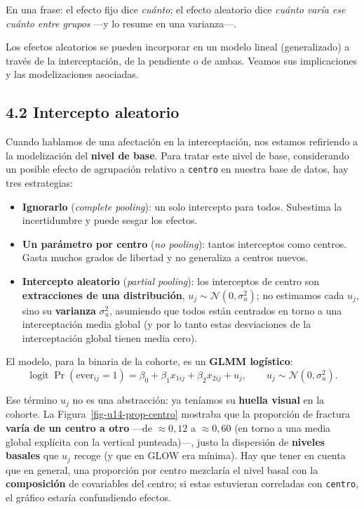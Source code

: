 \documentclass[
  letterpaper,
  DIV=11,
  numbers=noendperiod]{scrartcl}
\providecommand{\tightlist}{%
  \setlength{\itemsep}{0pt}\setlength{\parskip}{0pt}}\usepackage{longtable,booktabs,array}
\begin{document}
En una frase: el efecto fijo dice \emph{cuánto}; el efecto aleatorio
dice \emph{cuánto varía ese cuánto entre grupos} ---y lo resume en una
varianza---.

Los efectos aleatorios se pueden incorporar en un modelo lineal
(generalizado) a través de la interceptación, de la pendiente o de
ambas. Veamos sus implicaciones y las modelizaciones asociadas.

\hypertarget{sec-u14-intercepto}{%
\subsection{4.2 Intercepto aleatorio}\label{sec-u14-intercepto}}

Cuando hablamos de una afectación en la interceptación, nos estamos
refiriendo a la modelización del \textbf{nivel de base}. Para tratar
este nivel de base, considerando un posible efecto de agrupación
relativo a \texttt{centro} en nuestra base de datos, hay tres
estrategias:

\begin{itemize}
\tightlist
\item
  \textbf{Ignorarlo} (\emph{complete pooling}): un solo intercepto para
  todos. Subestima la incertidumbre y puede sesgar los efectos.
\item
  \textbf{Un parámetro por centro} (\emph{no pooling}): tantos
  interceptos como centros. Gasta muchos grados de libertad y no
  generaliza a centros nuevos.
\item
  \textbf{Intercepto aleatorio} (\emph{partial pooling}): los
  interceptos de centro son \textbf{extracciones de una distribución},
  \(u_j\sim\mathcal{N}(0,\sigma_u^2)\); no estimamos cada \(u_j\), sino
  su \textbf{varianza} \(\sigma_u^2\), asumiendo que todos están
  centrados en torno a una interceptación media global (y por lo tanto
  estas desviaciones de la interceptación global tienen media cero).
\end{itemize}

El modelo, para la binaria de la cohorte, es un \textbf{GLMM logístico}:
\[
\operatorname{logit}\Pr(\text{ever}_{ij}=1)=\beta_0+\beta_1 x_{1ij}+\beta_2 x_{2ij}+u_j,
\qquad u_j\sim\mathcal{N}(0,\sigma_u^2).
\]

Ese término \(u_j\) no es una abstracción: ya teníamos su \textbf{huella
visual} en la cohorte. La Figura~\ref{fig-u14-prop-centro} mostraba que
la proporción de fractura \textbf{varía de un centro a otro} ---de
\(\approx 0{,}12\) a \(\approx 0{,}60\) (en torno a una media global
explícita con la vertical punteada)---, justo la dispersión de
\textbf{niveles basales} que \(u_j\) recoge (y que en GLOW era mínima).
Hay que tener en cuenta que en general, una proporción por centro
mezclaría el nivel basal con la \textbf{composición} de covariables del
centro; si estas estuvieran correladas con \texttt{centro}, el gráfico
estaría confundiendo efectos.
\end{document}
